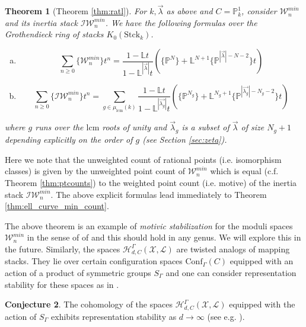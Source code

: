 \documentclass[a4paper,12pt]{amsart}
\newtheorem{thm}{Theorem}[section]
\theoremstyle{definition}
\newtheorem{conj}[thm]{Conjecture}
\newcommand{\bP}{\mathbb{P}}
\newcommand{\cX}{\mathcal{X}}
\newcommand{\cL}{\mathcal{L}}
\newcommand{\cW}{\mathcal{W}}
\newcommand{\cH}{\mathcal{H}}
\newcommand{\cI}{\mathcal{I}}
\newcommand{\lambdavec}{{\vec{\lambda}}}
\newcommand{\Pb}{\mathbb{P}}
\newcommand{\Lb}{\mathbb{L}}
\begin{document}
	\begin{thm}[Theorem \ref{thm:ratl}]\label{thm:motive_generating_series} For $k, \lambdavec$ as above and $C = \bP^1_k$, consider $\cW_n^{min}$ and its inertia stack $\cI \cW_n^{min}$. We have the following formulas over the Grothendieck ring of stacks $K_0(\mathrm{Stck}_k)$. 
		
		\begin{enumerate}[(a)]
			\item 
			$$
			\sum_{n \geq 0} \{\cW_n^{min}\}t^n = \frac{ 1-\Lb t }{1-\Lb^{|\vec{\lambda}|}t} \left( \{\Pb^N\} + \Lb^{N+1}  \{\Pb^{|\vec{\lambda}|-N-2} \} t \right) 
			$$
			\item 
			$$
			\sum_{n \geq 0} \{\cI \cW_n^{min}\}t^n = \sum_{g \in \mu_{\mathrm{lcm}}(k)} \frac{ 1-\Lb t }{1-\Lb^{|\vec{\lambda_{g}}|}t} \left( \{\Pb^{{N_g}}\} + \Lb^{{N_g}+1}  \{\Pb^{|\vec{\lambda_{g}}| - {N_g} -2} \} t \right)
			$$
		\end{enumerate}
		where $g$ runs over the $\mathrm{lcm}$ roots of unity and $\lambdavec_g$ is a subset of $\lambdavec$ of size $N_g + 1$ depending explicitly on the order of $g$ (see Section \ref{sec:zeta}). 
	\end{thm}
	
	Here we note that the unweighted count of rational points (i.e. isomorphism classes) is given by the unweighted point count of $\cW_n^{min}$ which is equal (c.f. Theorem \ref{thm:ptcounts}) to the weighted point count (i.e. motive) of the inertia stack $\cI \cW_n^{min}$. The above explicit formulas lead immediately to Theorem \ref{thm:ell_curve_min_count}.
	
	\medskip
	
	The above theorem is an example of \emph{motivic stabilization} for the moduli spaces $\cW_n^{min}$ in the sense of of \cite{VW} and this should hold in any genus. We will explore this in the future. Similarly, the spaces $\cH_{d,C}^\Gamma(\cX, \cL)$ are twisted analogs of mapping stacks. They lie over certain configuration spaces $\mathrm{Conf}_\Gamma(C)$ equipped with an action of a product of symmetric groups $S_\Gamma$ and one can consider representation stability for these spaces as in \cite{CEF}. 
	
	\begin{conj}
		The cohomology of the spaces $\cH^\Gamma_{d,C}(\cX, \cL)$ equipped with the action of $S_\Gamma$ exhibits representation stability as $d \to \infty$ (see e.g. \cite{CEF}). 
	\end{conj} 
	
\end{document}

